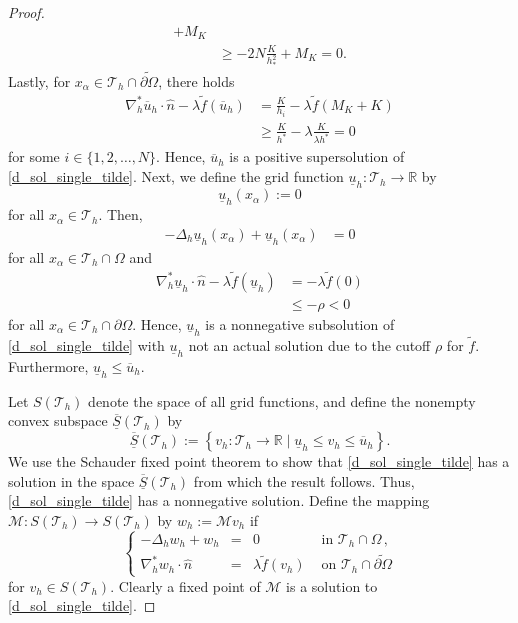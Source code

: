 \documentclass[10pt,a4paper]{amsart}
\begin{document}
\begin{proof}
\begin{align*}
        + M_K \\ 
    & \geq - 2N \frac{K}{h_*^2} + M_K = 0 . 
\end{align*}
Lastly, for $x_\alpha \in \mathcal{T}_h \cap \widetilde{\partial \Omega}$, there holds 
\begin{align*}
    \nabla_h^* \overline{u}_{h}  \cdot \widehat{n} - \lambda \widetilde{f}(\overline{u}_{h})
    & = \frac{K}{h_i} - \lambda \widetilde{f}(M_K+K) \\ 
    & \geq \frac{K}{h^*} - \lambda \frac{K}{\lambda h^*} = 0  
\end{align*}
for some $i \in \{1,2,\ldots,N\}$.  
Hence, $\overline{u}_h$ is a positive supersolution of \eqref{d_sol_single_tilde}.  
Next, we define the grid function $\underline{u}_h : \mathcal{T}_h \to \mathbb{R}$ by 
\begin{equation}
    \underline{u}_h(x_\alpha) := 0 
\end{equation}
for all $x_\alpha \in \mathcal{T}_h$.  
Then, 
\begin{align*}
    -\Delta_h \underline{u}_h(x_\alpha) + \underline{u}_h(x_\alpha) 
    & = 0 
\end{align*}
for all $x_\alpha \in \mathcal{T}_h \cap \Omega$ 
and 
\begin{align*}
    \nabla_h^* \underline{u}_{h}  \cdot \widehat{n} - \lambda \widetilde{f}(\underline{u}_{h})
    & = - \lambda \widetilde{f}(0) \\ 
    & \leq - \rho < 0 
\end{align*}
for all $x_\alpha \in \mathcal{T}_h \cap \partial \Omega$.  
Hence, $\underline{u}_h$ is a nonnegative subsolution of \eqref{d_sol_single_tilde} 
with $\underline{u}_h$ not an actual solution due to the cutoff $\rho$ for $\widetilde{f}$.  
Furthermore, $\underline{u}_h \leq \overline{u}_h$.  

Let $S(\mathcal{T}_h)$ denote the space of all grid functions, 
and define the nonempty convex subspace $\overline{\underline{S}}(\mathcal{T}_h)$ by 
\[
    \overline{\underline{S}}(\mathcal{T}_h) := \left\{ v_h : \mathcal{T}_h \to \mathbb{R} \mid 
    \underline{u}_h \leq v_h \leq \overline{u}_h \right\} . 
\]
We use the Schauder fixed point theorem to show that \eqref{d_sol_single_tilde} has a solution in the space 
$\overline{\underline{S}}(\mathcal{T}_h)$ from which the result follows.  
Thus, \eqref{d_sol_single_tilde} has a nonnegative solution.  
Define the mapping $\mathcal{M} : S(\mathcal{T}_h) \to S(\mathcal{T}_h)$ by 
$w_h := \mathcal{M} v_h$ if 
\begin{equation}\label{cM_mapping}
    \left\lbrace\begin{array}{rcll}
    -\Delta_{h} w_{h}+ w_{h}&=&0 & \mbox{ in } \mathcal{T}_h \cap \Omega \,, \\
    \nabla_h^* w_{h}  \cdot \widehat{n} &=& \lambda \widetilde{f}(v_{h}  ) & \mbox{ on } \mathcal{T}_h \cap \widetilde{\partial \Omega} 
    \end{array}\right.
\end{equation}
for $v_h \in S(\mathcal{T}_h)$. 
Clearly a fixed point of $\mathcal{M}$ is a solution to \eqref{d_sol_single_tilde}.  


\end{proof}
\end{document}
